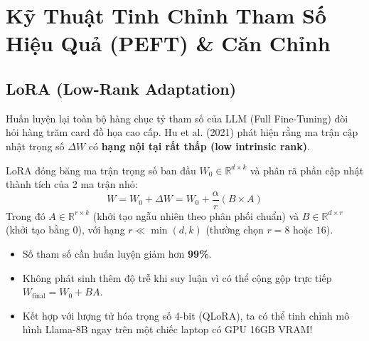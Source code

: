\section{Kỹ Thuật Tinh Chỉnh Tham Số Hiệu Quả (PEFT) \& Căn Chỉnh}

\subsection{LoRA (Low-Rank Adaptation)}
Huấn luyện lại toàn bộ hàng chục tỷ tham số của LLM (Full Fine-Tuning) đòi hỏi hàng trăm card đồ họa cao cấp. Hu et al. (2021) phát hiện rằng ma trận cập nhật trọng số $\Delta W$ có \textbf{hạng nội tại rất thấp (low intrinsic rank)}.

LoRA đóng băng ma trận trọng số ban đầu $W_0 \in \mathbb{R}^{d \times k}$ và phân rã phần cập nhật thành tích của 2 ma trận nhỏ:
\begin{equation}
W = W_0 + \Delta W = W_0 + \frac{\alpha}{r} (B \times A)
\end{equation}
Trong đó $A \in \mathbb{R}^{r \times k}$ (khởi tạo ngẫu nhiên theo phân phối chuẩn) và $B \in \mathbb{R}^{d \times r}$ (khởi tạo bằng 0), với hạng $r \ll \min(d, k)$ (thường chọn $r = 8$ hoặc $16$).
\begin{itemize}
    \item Số tham số cần huấn luyện giảm hơn \textbf{99\%}.
    \item Không phát sinh thêm độ trễ khi suy luận vì có thể cộng gộp trực tiếp $W_{\text{final}} = W_0 + B A$.
    \item Kết hợp với lượng tử hóa trọng số 4-bit (QLoRA), ta có thể tinh chỉnh mô hình Llama-8B ngay trên một chiếc laptop có GPU 16GB VRAM!
\end{itemize}

